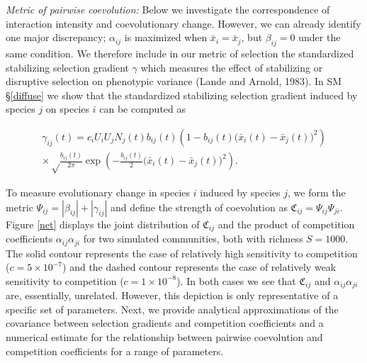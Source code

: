 \documentclass[]{elsarticle} %
\begin{document}
\emph{Metric of pairwise coevolution:} Below we investigate the
correspondence of interaction intensity and coevolutionary change.
However, we can already identify one major discrepancy; \(\alpha_{ij}\)
is maximized when \(\bar x_i=\bar x_j\), but \(\beta_{ij}=0\) under the
same condition. We therefore include in our metric of selection the
standardized stabilizing selection gradient \(\gamma\) which measures
the effect of stabilizing or disruptive selection on phenotypic variance
(Lande and Arnold, 1983). In SM \S\ref{diffuse} we show that the
standardized stabilizing selection gradient induced by species \(j\) on
species \(i\) can be computed as

\begin{multline}
\gamma_{ij}(t)=c_iU_iU_jN_j(t)b_{ij}(t)\left(1-b_{ij}(t)\big(\bar x_i(t)-\bar x_j(t)\big)^2\right) \\
\times\sqrt\frac{b_{ij}(t)}{2\pi}\exp\left(-\frac{b_{ij}(t)}{2}\big(\bar x_i(t)-\bar x_j(t)\big)^2\right).
\end{multline}

To measure evolutionary change in species \(i\) induced by species
\(j\), we form the metric \(\Psi_{ij}=|\beta_{ij}|+|\gamma_{ij}|\) and
define the strength of coevolution as
\(\mathfrak{C}_{ij}=\Psi_{ij}\Psi_{ji}\). Figure \ref{net} displays the
joint distribution of \(\mathfrak{C}_{ij}\) and the product of
competition coefficients \(\alpha_{ij}\alpha_{ji}\) for two simulated
communities, both with richness \(S=1000\). The solid contour represents
the case of relatively high sensitivity to competition
(\(c=5\times10^{-7}\)) and the dashed contour represents the case of
relatively weak sensitivity to competition (\(c=1\times10^{-8}\)). In
both cases we see that \(\mathfrak{C}_{ij}\) and
\(\alpha_{ij}\alpha_{ji}\) are, essentially, unrelated. However, this
depiction is only representative of a specific set of parameters. Next,
we provide analytical approximations of the covariance between selection
gradients and competition coefficients and a numerical estimate for the
relationship between pairwise coevolution and competition coefficients
for a range of parameters.
\end{document}
